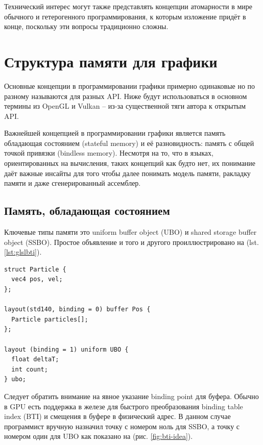 \documentclass[a4paper,12pt,oneside]{article}
\begin{document}
Технический интерес могут также представлять концепции атомарности в мире обычного и гетерогенного программирования, к которым изложение придёт в конце, поскольку эти вопросы традиционно сложны.

\pagebreak
\section{Структура памяти для графики}\label{sec:GPUMEM}

Основные концепции в программировании графики примерно одинаковые но по разному называются для разных API. Ниже будут использоваться в основном термины из OpenGL и Vulkan -- из-за существенной тяги автора к открытым API. 

Важнейшей концепцией в программировании графики является память обладающая состоянием (stateful memory) и её разновидность: память с общей точкой привязки (bindless memory). 
Несмотря на то, что в языках, ориентированных на вычисления, таких концепций как будто нет, их понимание даёт важные инсайты для того чтобы далее понимать модель памяти, ракладку памяти и даже сгенерированный ассемблер.

\subsection{Память, обладающая состоянием}\label{subsec:stateful}

Ключевые типы памяти это uniform buffer object (UBO) и shared storage buffer object (SSBO). Простое объявление и того и другого проиллюстрировано на (lst. \ref{lst:glslbti}).

\begin{lstlisting}[caption={Простая программа на GLSL с явными binding индексами},label={lst:glslbti}]
struct Particle {
  vec4 pos, vel;
};

layout(std140, binding = 0) buffer Pos {
  Particle particles[];
};

layout (binding = 1) uniform UBO {
  float deltaT; 
  int count;
} ubo;
\end{lstlisting}

Следует обратить внимание на явное указание binding point для буфера. Обычно в GPU есть поддержка в железе для быстрого преобразования binding table index (BTI) и смещения в буфере в физический адрес. В данном случае программист вручную назначил точку с номером ноль для SSBO, а точку с номером один для UBO как показано на (рис. \ref{fig:bti-idea}).
\end{document}
